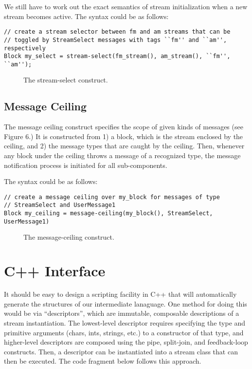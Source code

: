 We still have to work out the exact semantics of stream initialization
when a new stream becomes active.  The syntax could be as follows:

\begin{verbatim}
// create a stream selector between fm and am streams that can be 
// toggled by StreamSelect messages with tags ``fm'' and ``am'', respectively
Block my_select = stream-select(fm_stream(), am_stream(), ``fm'', ``am'');
\end{verbatim}

\begin{figure}[t]
\centerline{}
\vspace{-24pt}
\caption{\protect\small The stream-select construct.}
\end{figure}

\subsection{Message Ceiling}

The message ceiling construct specifies the scope of given kinds of
messages (see Figure 6.)  It is constructed from 1) a block, which is
the stream enclosed by the ceiling, and 2) the message types that are
caught by the ceiling.  Then, whenever any block under the ceiling
throws a message of a recognized type, the message notification process
is initiated for all sub-components.

The syntax could be as follows:

\begin{verbatim}
// create a message ceiling over my_block for messages of type
// StreamSelect and UserMessage1
Block my_ceiling = message-ceiling(my_block(), StreamSelect, UserMessage1)
\end{verbatim}

\begin{figure}[t]
\centerline{}
\vspace{-24pt}
\caption{\protect\small The message-ceiling construct.}
\end{figure}

\section{C++ Interface}

It should be easy to design a scripting facility in C++ that will
automatically generate the structures of our intermediate lanaguage.
One method for doing this would be via ``descriptors'', which are
immutable, composable descriptions of a stream instantiation.  The
lowest-level descriptor requires specifying the type and primitive
arguments (chars, ints, strings, etc.) to a constructor of that type,
and higher-level descriptors are composed using the pipe, split-join,
and feedback-loop constructs.  Then, a descriptor can be instantiated
into a stream class that can then be executed.  The code fragment below
follows this approach.


